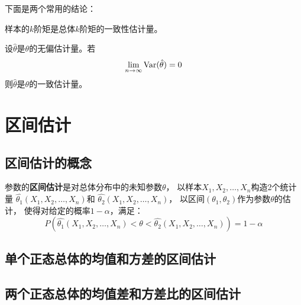 下面是两个常用的结论：

\begin{theorem}
  样本的$k$阶矩是总体$k$阶矩的一致性估计量。
\end{theorem}

\begin{theorem}
  设$\hat{\theta}$是$\theta$的无偏估计量。若
  \begin{displaymath}
    \lim_{n\to\infty}\textrm{Var}(\hat{\theta})=0
  \end{displaymath}
  则$\hat{\theta}$是$\theta$的一致估计量。
\end{theorem}

\section{区间估计}

\subsection{区间估计的概念}
参数的\textbf{区间估计}是对总体分布中的未知参数$\theta$，
以样本$X_1,X_2,\dots,X_n$构造2个统计量
$\hat{\theta_1}(X_1,X_2,\dots,X_n)$和
$\hat{\theta_2}(X_1,X_2,\dots,X_n)$，
以区间$(\theta_1,\theta_2)$作为参数$\theta$的估计，
使得对给定的概率$1-\alpha$，满足：
\begin{displaymath}
  P\left(\hat{\theta_1}(X_1,X_2,\dots,X_n) < \theta <
    \hat{\theta_2}(X_1,X_2,\dots,X_n)\right) = 1-\alpha 
\end{displaymath}  

\subsection{单个正态总体的均值和方差的区间估计}

\subsection{两个正态总体的均值差和方差比的区间估计}